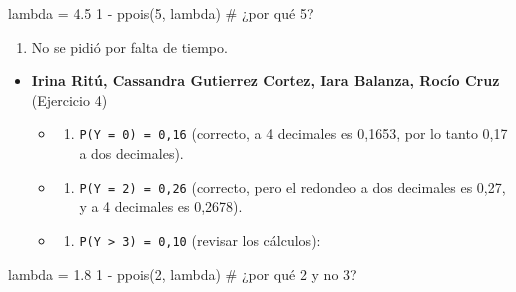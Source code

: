\documentclass[
  spanish,
  letterpaper,
  DIV=11,
  numbers=noendperiod]{scrreprt}
\newenvironment{Shaded}{\begin{snugshade}}{\end{snugshade}}
\newcommand{\CommentTok}[1]{\textcolor[rgb]{0.37,0.37,0.37}{#1}}
\newcommand{\DecValTok}[1]{\textcolor[rgb]{0.68,0.00,0.00}{#1}}
\newcommand{\FloatTok}[1]{\textcolor[rgb]{0.68,0.00,0.00}{#1}}
\newcommand{\FunctionTok}[1]{\textcolor[rgb]{0.28,0.35,0.67}{#1}}
\newcommand{\NormalTok}[1]{\textcolor[rgb]{0.00,0.23,0.31}{#1}}
\newcommand{\OtherTok}[1]{\textcolor[rgb]{0.00,0.23,0.31}{#1}}
\newcommand{\SpecialCharTok}[1]{\textcolor[rgb]{0.37,0.37,0.37}{#1}}
\providecommand{\tightlist}{%
  \setlength{\itemsep}{0pt}\setlength{\parskip}{0pt}}
\begin{document}
\begin{Shaded}
\begin{Highlighting}[]
\NormalTok{lambda }\OtherTok{=} \FloatTok{4.5}
\DecValTok{1} \SpecialCharTok{{-}} \FunctionTok{ppois}\NormalTok{(}\DecValTok{5}\NormalTok{, lambda) }\CommentTok{\# ¿por qué 5?}
\end{Highlighting}
\end{Shaded}

\begin{enumerate}
\def\labelenumi{\alph{enumi})}
\setcounter{enumi}{3}
\tightlist
\item
  No se pidió por falta de tiempo.
\end{enumerate}

\begin{itemize}
\item
  \textbf{Irina Ritú, Cassandra Gutierrez Cortez, Iara Balanza, Rocío
  Cruz} (Ejercicio 4)

  \begin{itemize}
  \tightlist
  \item
    \begin{enumerate}
    \def\labelenumi{\alph{enumi})}
    \tightlist
    \item
      \texttt{P(Y\ =\ 0)\ =\ 0,16} (correcto, a 4 decimales es 0,1653,
      por lo tanto 0,17 a dos decimales).
    \end{enumerate}
  \item
    \begin{enumerate}
    \def\labelenumi{\alph{enumi})}
    \setcounter{enumi}{1}
    \tightlist
    \item
      \texttt{P(Y\ =\ 2)\ =\ 0,26} (correcto, pero el redondeo a dos
      decimales es 0,27, y a 4 decimales es 0,2678).
    \end{enumerate}
  \item
    \begin{enumerate}
    \def\labelenumi{\alph{enumi})}
    \setcounter{enumi}{2}
    \tightlist
    \item
      \texttt{P(Y\ \textgreater{}\ 3)\ =\ 0,10} (revisar los cálculos):
    \end{enumerate}
  \end{itemize}
\end{itemize}

\begin{Shaded}
\begin{Highlighting}[]
\NormalTok{lambda }\OtherTok{=} \FloatTok{1.8}
\DecValTok{1} \SpecialCharTok{{-}} \FunctionTok{ppois}\NormalTok{(}\DecValTok{2}\NormalTok{, lambda) }\CommentTok{\# ¿por qué 2 y no 3?}
\end{Highlighting}
\end{Shaded}
\end{document}
